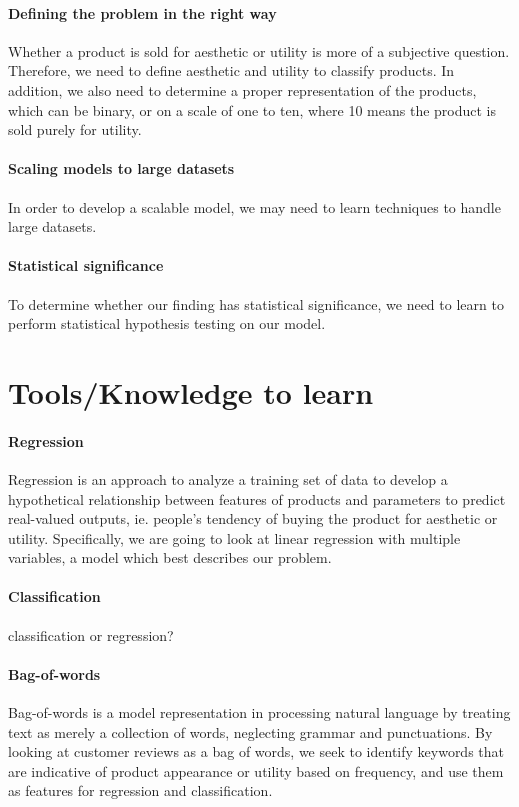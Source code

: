 \documentclass[dvips,12pt]{article}
\begin{document}
\paragraph{Defining the problem in the right way}
Whether a product is sold for aesthetic or utility is more of a subjective question. Therefore, we need to define aesthetic and utility to classify products. In addition, we also need to determine a proper representation of the products, which can be binary, or on a scale of one to ten, where 10 means the product is sold purely for utility.

\paragraph{Scaling models to large datasets}
In order to develop a scalable model, we may need to learn techniques to handle large datasets.

\paragraph{Statistical significance}
To determine whether our finding has statistical significance, we need to learn to perform statistical hypothesis testing on our model.

\section{Tools/Knowledge to learn}

\paragraph{Regression} 
Regression is an approach to analyze a training set of data to develop a hypothetical relationship between features of products and parameters to predict real-valued outputs, ie. people's tendency of buying the product for aesthetic or utility. Specifically, we are going to look at linear regression with multiple variables, a model which best describes our problem.
	
\paragraph{Classification}
classification or regression?
	
\paragraph{Bag-of-words}
Bag-of-words is a model representation in processing natural language by treating text as merely a collection of words, neglecting grammar and punctuations. By looking at customer reviews as a bag of words, we seek to identify keywords that are indicative of product appearance or utility based on frequency, and use them as features for regression and classification.
	
\end{document}
